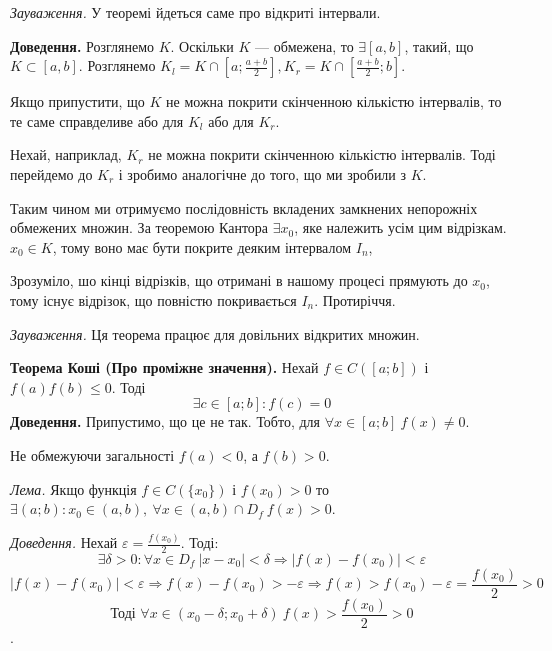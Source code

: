 \documentclass[12pt]{report}
\begin{document}
\textit{Зауваження.} У теоремі йдеться саме про відкриті інтервали.

\vspace{3mm}

\textbf{Доведення.} Розглянемо $K$. Оскільки $K$ --- обмежена, то $\exists [a,b]$, такий, що $K \subset [a,b]$. Розглянемо $K_l = K \cap [a;\frac{a+b}{2}], K_r = K \cap [\frac{a+b}{2}; b]$.

Якщо припустити, що $K$ не можна покрити скінченною кількістю інтервалів, то те саме справделиве або для $K_l$ або для $K_r$. 

Нехай, наприклад, $K_r$ не можна покрити скінченною кількістю інтервалів. Тоді перейдемо до $K_r$ і зробимо аналогічне до того, що ми зробили з $K$. 

Таким чином ми отримуємо послідовність вкладених замкнених непорожніх обмежених множин. За теоремою Кантора $\exists x_0$, яке належить усім цим відрізкам. $x_0 \in K$, тому воно має бути покрите деяким інтервалом $I_n$, 

Зрозуміло, шо кінці відрізків, що отримані в нашому процесі прямують до $x_0$, тому існує відрізок, що повністю покривається $I_n$. Протиріччя.

\vspace{3mm}

\textit{Зауваження.} Ця теорема працює для довільних відкритих множин.

\vspace{5mm}

\textbf{Теорема Коші (Про проміжне значення).} Нехай $f \in C([a;b])$ і $f(a) f(b) \leq 0$. Тоді
$$\exists c \in [a;b] : f(c) = 0$$
\textbf{Доведення.} Припустимо, що це не так. Тобто, для $\forall x \in [a;b]\ f(x) \neq 0$. 

Не обмежуючи загальності $f(a) < 0$, а $f(b) > 0$.

\vspace{3mm}

\textit{Лема.} Якщо функція $f \in C(\{x_0\}) \textrm{ і } f(x_0) > 0$ то $\exists (a;b) : x_0 \in (a,b),\ \forall x \in (a,b)\cap D_f\ f(x) > 0$.

\textit{Доведення.} Нехай $ \varepsilon = \frac{f(x_0)}{2}$. Тоді:
$$ \exists \delta > 0 : \forall x \in D_f\ |x - x_0| < \delta \Longrightarrow |f(x) - f(x_0)| < \varepsilon$$
$$|f(x) - f(x_0)| < \varepsilon \Longrightarrow f(x) - f(x_0) > - \varepsilon \Longrightarrow f(x) > f(x_0) - \varepsilon = \frac{f(x_0)}{2} > 0$$
$$\textrm{Тоді } \forall x \in (x_0 - \delta; x_0 + \delta)\ f(x) > \frac{f(x_0)}{2} > 0$$.
\end{document}
